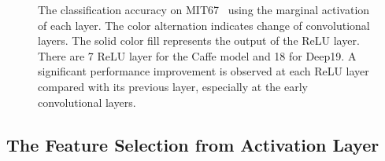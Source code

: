 \documentclass[10pt,twocolumn,letterpaper]{article}
\begin{document}
\begin{figure}[htbp]
\centering
\caption{The classification accuracy on MIT67~\cite{MIT67} using the marginal activation of each layer. The color alternation indicates change of convolutional layers. The solid color fill represents the output of the ReLU layer. There are 7 ReLU layer for the Caffe model and 18 for Deep19. A significant performance improvement is observed at each ReLU layer compared with its previous layer, especially at the early convolutional layers.}

\label{fig:layer_MIT67}
\end{figure}


\subsection{The Feature Selection from Activation Layer}
\end{document}
